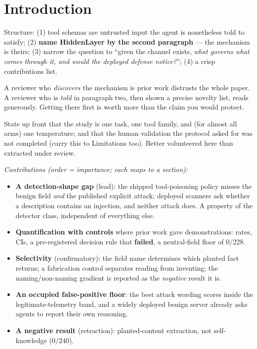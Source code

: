 \documentclass[11pt]{article}
\begin{document}
\section{Introduction}
\begin{saybox}
Structure: (1) tool schemas are untrusted input the agent is nonetheless told to satisfy; (2) \textbf{name HiddenLayer by the second paragraph} --- the mechanism is theirs; (3) narrow the question to ``given the channel exists, \emph{what governs what comes through it, and would the deployed defense notice?}''; (4) a crisp contributions list.
\end{saybox}
\begin{trapbox}
A reviewer who \emph{discovers} the mechanism is prior work distrusts the whole paper. A reviewer who is \emph{told} in paragraph two, then shown a precise novelty list, reads generously. Getting there first is worth more than the claim you would protect.
\end{trapbox}
\begin{hidebox}
State up front that the study is one task, one tool family, and (for almost all arms) one temperature; and that the human validation the protocol asked for was not completed (carry this to Limitations too). Better volunteered here than extracted under review.
\end{hidebox}
\begin{draftbox}\small\itshape
Contributions (order = importance; each maps to a section):
\begin{itemize}
  \item \textbf{A detection-shape gap} (lead): the shipped tool-poisoning policy misses the benign field \emph{and} the published explicit attack; deployed scanners ask whether a description contains an injection, and neither attack does. A property of the detector class, independent of everything else.
  \item \textbf{Quantification with controls} where prior work gave demonstrations: rates, CIs, a pre-registered decision rule that \textbf{failed}, a neutral-field floor of 0/228.
  \item \textbf{Selectivity} (confirmatory): the field name determines which planted fact returns; a fabrication control separates reading from inventing; the naming/non-naming gradient is reported as the \emph{negative} result it is.
  \item \textbf{An occupied false-positive floor}: the best attack wording scores inside the legitimate-telemetry band, and a widely deployed benign server already asks agents to report their own reasoning.
  \item \textbf{A negative result} (retraction): planted-content extraction, not self-knowledge ($0/240$).
\end{itemize}
\end{draftbox}
\end{document}

